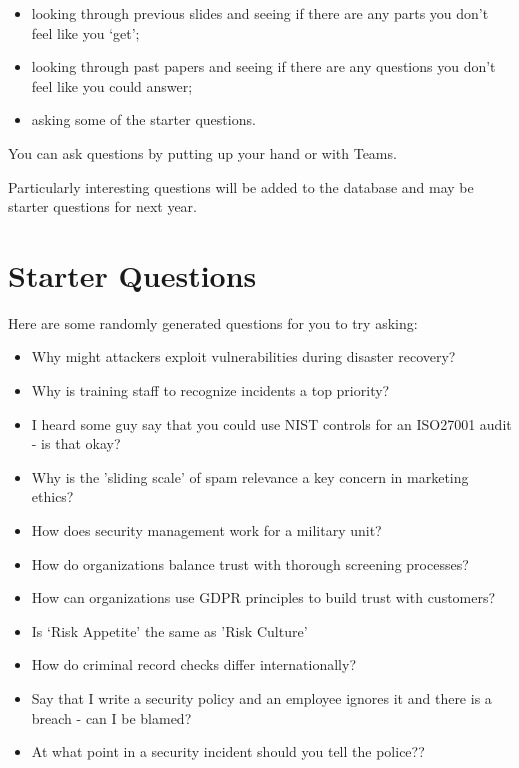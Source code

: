 \documentclass[12pt]{article}
\begin{document}
\begin{itemize} 
\item looking through previous slides and seeing if there are any parts you don't feel like you `get';
\item looking through past papers and seeing if there are any questions you don't feel like you could answer;
\item asking some of the starter questions.
\end{itemize} 

You can ask questions by putting up your hand or with Teams.  

Particularly interesting questions will be added to the database and may be starter questions for next year.  

\section*{Starter Questions} 
Here are some randomly generated questions for you to try asking: 

\begin{itemize}
  \item Why might attackers exploit vulnerabilities during disaster recovery?
  \item Why is training staff to recognize incidents a top priority?
  \item I heard some guy say that you could use NIST controls for an ISO27001 audit - is that okay?
  \item Why is the 'sliding scale' of spam relevance a key concern in marketing ethics?
  \item How does security management work for a military unit?
  \item How do organizations balance trust with thorough screening processes?
  \item How can organizations use GDPR principles to build trust with customers?
  \item Is `Risk Appetite' the same as 'Risk Culture'
  \item How do criminal record checks differ internationally?
  \item Say that I write a security policy and an employee ignores it and there is a breach - can I be blamed?
  \item At what point in a security incident should you tell the police??
\end{itemize}

\end{document}
